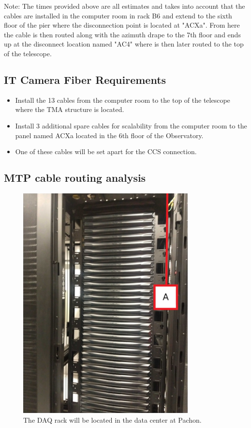 Note: The times provided above are all estimates and takes into account that the cables are installed in the computer room in rack B6 and extend to the sixth floor of the pier where the disconnection point is located at "ACXa". From here the cable is then routed along with the azimuth drape to the 7th floor and ends up at the disconnect location named "AC4" where is then later routed to the top of the telescope.

\newpage

  \subsection{IT Camera Fiber Requirements}

  \begin{itemize}
    \item Install the 13 cables from the computer room to the top of the telescope where the TMA structure is located. 
    \item Install 3 additional spare cables for scalability from the computer room to the panel named ACXa located in the 6th floor of the Observatory.
    \item One of these cables will be set apart for the CCS connection. 
  \end{itemize}

  \subsection{MTP cable routing analysis}
  \begin{figure}
    \centering
    \includegraphics[width=9cm]{images/111.jpg}
    \caption*{The DAQ rack will be located in the data center at Pachon.} 
  \end{figure}

